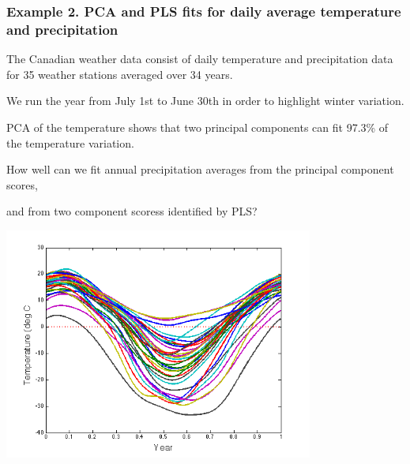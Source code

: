 \documentclass[11pt]{beamer}
\begin{document}
\begin{frame}

\frametitle{Example 2.  PCA and PLS fits for daily average temperature and precipitation}

\bi
  \item The Canadian weather data consist of daily temperature and precipitation data for 35 weather stations averaged over 34 years.
  \item We run the year from July 1st to June 30th in order to highlight winter variation.
  \item PCA of the temperature shows that two principal components can fit 97.3\% of the temperature variation.
  \item How well can we fit annual precipitation averages from the principal component scores, 
  \item and from two component scoress identified by PLS? 
\ei

\end{frame}


\begin{frame}

\begin{center}
\includegraphics[width=4in]{figs/Daily_TempData.png}
\end{center}

\end{frame}

\end{document}
